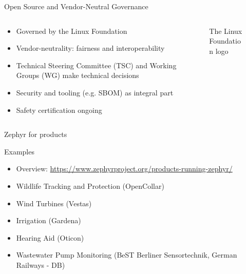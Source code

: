 \documentclass[10pt, aspectratio=169]{beamer}
\begin{document}
\begin{frame}[fragile]{Open Source and Vendor-Neutral Governance}
  \begin{columns}
    \begin{column}{0.6\textwidth}
      \begin{itemize}
        \item Governed by the Linux Foundation
        \item Vendor-neutrality: fairness and interoperability
        \item Technical Steering Committee (TSC) and Working Groups (WG) make technical decisions
        \item Security and tooling (e.g. SBOM) as integral part
        \item Safety certification ongoing
      \end{itemize}
    \end{column}
    \begin{column}{0.4\textwidth}
      \begin{figure}
        
        \caption*{The Linux Foundation logo}
      \end{figure}
    \end{column}
  \end{columns}
\end{frame}
\begin{frame}[fragile]{Zephyr for products}

  \begin{block}{Examples}
    \begin{itemize}
       \item Overview: {\scriptsize \url{https://www.zephyrproject.org/products-running-zephyr/}}
       \item Wildlife Tracking and Protection (OpenCollar)
       \item Wind Turbines (Vestas)
       \item Irrigation (Gardena)
       \item Hearing Aid (Oticon)
       \item Wastewater Pump Monitoring (BeST Berliner Sensortechnik, German Railways - DB)
    \end{itemize}

  \end{block}
\end{frame}
\end{document}

